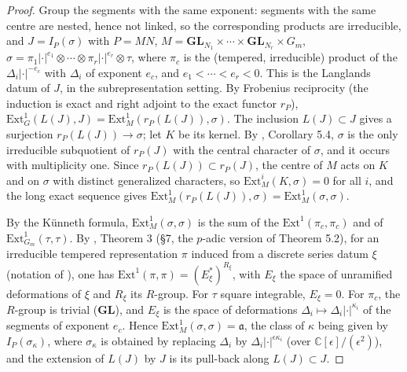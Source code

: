 \documentclass[a4paper,12pt,leqno]{amsart}
\theoremstyle{plain}
\theoremstyle{definition}
\begin{document}
\begin{proof}
Group the segments with the same exponent: segments with the same centre are nested, hence not
linked, so the corresponding products are irreducible, and $J=I_P(\sigma)$ with
$P=MN$, $M=\mathbf{GL}_{N_1}\times\cdots\times\mathbf{GL}_{N_r}\times G_m$,
$\sigma=\pi_1|\cdot|^{e_1}\otimes\cdots\otimes\pi_r|\cdot|^{e_r}\otimes\tau$, where $\pi_c$ is the
(tempered, irreducible) product of the $\Delta_i|\cdot|^{-e_c}$ with $\Delta_i$ of exponent
$e_c$, and $e_1<\cdots<e_r<0$. This is the Langlands datum of $J$, in the subrepresentation
setting. By Frobenius reciprocity (the induction is exact and right adjoint to the exact functor
$r_P$), $\mathrm{Ext}^1_G(L(J),J)=\mathrm{Ext}^1_M(r_P(L(J)),\sigma)$. The inclusion $L(J)\subset J$ gives
a surjection $r_P(L(J))\to\sigma$; let $K$ be its kernel. By \cite{BJ08}, Corollary 5.4, $\sigma$ is the
only irreducible subquotient of $r_P(J)$ with the central character of $\sigma$, and it occurs with
multiplicity one. Since $r_P(L(J))\subset r_P(J)$, the centre of $M$ acts on $K$ and on $\sigma$ with
distinct generalized characters, so $\mathrm{Ext}^i_M(K,\sigma)=0$ for all $i$, and the long exact
sequence gives $\mathrm{Ext}^1_M(r_P(L(J)),\sigma)=\mathrm{Ext}^1_M(\sigma,\sigma)$.

By the K\"unneth formula, $\mathrm{Ext}^1_M(\sigma,\sigma)$ is the sum of the
$\mathrm{Ext}^1(\pi_c,\pi_c)$ and of $\mathrm{Ext}^1_{G_m}(\tau,\tau)$. By \cite{OS13}, Theorem 3
(\S7, the $p$-adic version of Theorem 5.2), for an irreducible tempered representation
$\pi$ induced from a discrete series datum $\xi$ (notation of \cite{OS13}), one has
$\mathrm{Ext}^1(\pi,\pi)=(E_\xi^*)^{R_\xi}$, with $E_\xi$ the space of unramified deformations of
$\xi$ and $R_\xi$ its $R$-group. For $\tau$ square
integrable, $E_\xi=0$. For $\pi_c$, the $R$-group is trivial ($\mathbf{GL}$), and $E_\xi$ is the space
of deformations $\Delta_i\mapsto\Delta_i|\cdot|^{\kappa_i}$ of the segments of
exponent $e_c$. Hence $\mathrm{Ext}^1_M(\sigma,\sigma)=\mathfrak{a}$, the class of $\kappa$ being
given by $I_P(\sigma_\kappa)$, where $\sigma_\kappa$ is obtained by replacing $\Delta_i$
by $\Delta_i|\cdot|^{\epsilon\kappa_i}$ (over $\mathbb{C}[\epsilon]/(\epsilon^2)$), and the
extension of $L(J)$ by $J$ is its pull-back along $L(J)\subset J$.


\end{proof}
\end{document}
